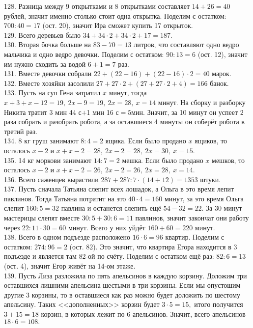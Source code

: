 128. Разница между 9 открытками и 8 открытками составляет $14+26=40$ рублей, значит именно столько стоит одна открытка. Поделим с остатком: $700:40=17$ (ост. 20), значит Ира сможет купить 17 открыток.\\
129. Всего деревьев было $34+34\cdot2+34\cdot2+17=187.$\\
130. Вторая бочка больше на $83-70=13$ литров, что составляют одно ведро мальчика и одно ведро девочки. Поделим с остатком: $90:13=6$ (ост. 12), значит им нужно сходить за водой $6+1=7$ раз.\\
131. Вместе девочки собрали $22+(22-16)+(22-16)\cdot2=40$ марок.\\
132. Вместе хозяйки засолили $27+27\cdot2+(27+27\cdot2+4)=166$ банок.\\
133. Пусть на суп Гена затратил $x$ минут, тогда $x+3+x-12=19,\ 2x-9=19,\ 2x=28,\ x=14$ минут. На сборку и разборку Никита тратит 3 мин 44 с$+$1 мин 16 с$=5$мин. Значит, за 10 минут он успеет 2 раза собрать и разобрать робота, а за оставшиеся 4 минуты он соберёт робота в третий раз.\\
134. 8 кг груш занимают $8:4=2$ ящика. Если было продано $x$ ящиков, то осталось $x-2$ и $x+x-2=28,\ 2x-2=28,\ 2x=30,\ x=15.$\\
135. 14 кг моркови занимают $14:7=2$ мешка. Если было продано $x$ мешков, то осталось $x-2$ и $x+x-2=26,\ 2x-2=26,\ 2x=28,\ x=14.$\\
136. Всего саженцев вырастили $287+287:7\cdot(14+12)=1353$ штуки.\\
137. Пусть сначала Татьяна слепит всех лошадок, а Ольга в это время лепит павлинов. Тогда Татьяна потратит на это $40\cdot4=160$ минут, за это время Ольга слепит $160:5=32$ павлина и останется слепить ещё $54-32=22.$ За 30 минут мастерицы слепят вместе $30:5+30:6=11$ павлинов, значит закончат они работу через $22:11\cdot30=60$ минут. Всего у них уйдёт $160+60=220$ минут.\\
138. Всего в одном подъезде расположено $16\cdot6=96$ квартир. Поделим с остатком: $274:96=2$ (ост. 82). Это значит, что квартира Егора находится в 3 подъезде и является там 82-ой по счёту. Поделим с остатком ещё раз: $82:6=13$ (ост. 4), значит Егор живёт на 14-ом этаже.\\
139.  Пусть Лиза разложила по пять апельсинов в каждую корзину. Доложим три оставшихся лишними апельсина шестыми в три корзины. Если мы опустошим другие 3 корзины, то в оставшиеся как раз можно будет доложить по шестому апельсину. Таких <<дополненных>> корзин будет $3\cdot5=15,$ итого получится $3+15=18$ корзин, в которых лежит по 6 апельсинов. Значит, всего апельсинов $18\cdot6=108.$\\
